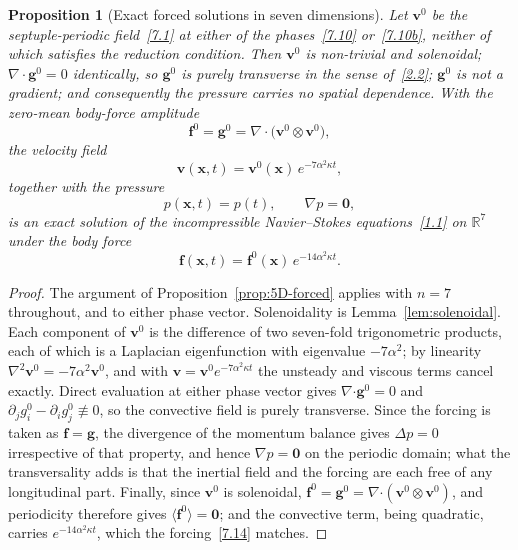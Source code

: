 \documentclass[11pt]{jfm}
\providecommand\bcdot{\boldsymbol{\cdot}}
\newtheorem{proposition}[lemma]{Proposition}
\numberwithin{equation}{section}
\begin{document}
\begin{proposition}[Exact forced solutions in seven dimensions]
\label{prop:7D-forced}
Let $\boldsymbol{v}^0$ be the septuple-periodic field~\eqref{7.1} at either of the
phases~\eqref{7.10} or~\eqref{7.10b}, neither of which satisfies the reduction condition. Then $\boldsymbol{v}^0$ is non-trivial and
solenoidal; $\nabla\cdot\boldsymbol{g}^0=0$ identically, so $\boldsymbol{g}^0$ is purely transverse
in the sense of~\eqref{2.2}; $\boldsymbol{g}^0$ is not a gradient; and consequently the pressure
carries no spatial dependence. With the zero-mean body-force amplitude
\begin{equation}
\label{7.11}
\boldsymbol{f}^0=\boldsymbol{g}^0=\nabla\cdot\bigl(\boldsymbol{v}^0\otimes\boldsymbol{v}^0\bigr),
\end{equation}
the velocity field
\begin{equation}
\label{7.12}
\boldsymbol{v}(\boldsymbol{x},t)=\boldsymbol{v}^0(\boldsymbol{x})\,e^{-7\alpha^2\kappa t},
\end{equation}
together with the pressure
\begin{equation}
\label{7.13}
p(\boldsymbol{x},t)=p(t),\qquad \nabla p=\boldsymbol{0},
\end{equation}
is an exact solution of the incompressible Navier--Stokes equations~\eqref{1.1} on $\mathbb{R}^7$
under the body force
\begin{equation}
\label{7.14}
\boldsymbol{f}(\boldsymbol{x},t)=\boldsymbol{f}^0(\boldsymbol{x})\,e^{-14\alpha^2\kappa t}.
\end{equation}
\end{proposition}

\begin{proof}
The argument of Proposition~\ref{prop:5D-forced} applies with $n=7$ throughout, and to either
phase vector. Solenoidality is
Lemma~\ref{lem:solenoidal}. Each component of $\boldsymbol{v}^0$ is the difference of two seven-fold trigonometric products,
each of which is a Laplacian eigenfunction with eigenvalue $-7\alpha^2$; by linearity
$\nabla^2\boldsymbol{v}^0=-7\alpha^2\boldsymbol{v}^0$, and with
$\boldsymbol{v}=\boldsymbol{v}^0e^{-7\alpha^2\kappa t}$ the unsteady and viscous terms cancel
exactly. Direct evaluation at either phase vector gives $\nabla\bcdot\boldsymbol{g}^0=0$ and
$\partial_jg_i^0-\partial_ig_j^0\not\equiv0$, so the convective field is purely transverse. Since
the forcing is taken as $\boldsymbol{f}=\boldsymbol{g}$, the divergence of the momentum balance
gives $\Delta p=0$ irrespective of that property, and hence $\nabla p=\boldsymbol{0}$ on the
periodic domain; what the transversality adds is that the inertial field and the forcing are each
free of any longitudinal part. Finally, since $\boldsymbol{v}^0$ is solenoidal,
$\boldsymbol{f}^0=\boldsymbol{g}^0=\nabla\bcdot(\boldsymbol{v}^0\otimes\boldsymbol{v}^0)$, and
periodicity therefore gives $\langle\boldsymbol{f}^0\rangle=\boldsymbol{0}$; and the convective term, being quadratic, carries
$e^{-14\alpha^2\kappa t}$, which the forcing~\eqref{7.14} matches.
\end{proof}
\end{document}

